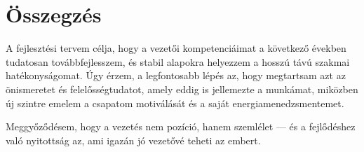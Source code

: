 \section{Összegzés}

A fejlesztési tervem célja, hogy a vezetői kompetenciáimat a következő években tudatosan továbbfejlesszem, 
és stabil alapokra helyezzem a hosszú távú szakmai hatékonyságomat.
Úgy érzem, a legfontosabb lépés az, hogy megtartsam azt az önismeretet és felelősségtudatot, 
amely eddig is jellemezte a munkámat, miközben új szintre emelem a csapatom motiválását és a saját energiamenedzsmentemet.

Meggyőződésem, hogy a vezetés nem pozíció, hanem szemlélet — és a fejlődéshez való nyitottság az, 
ami igazán jó vezetővé teheti az embert.

